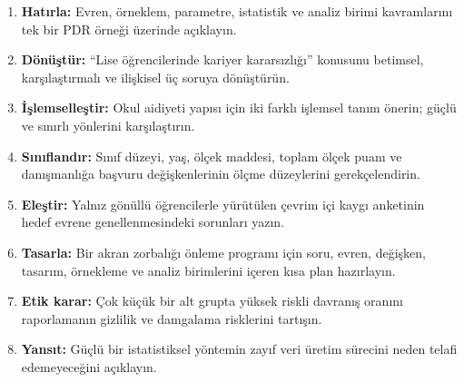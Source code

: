 \begin{enumerate}
\renewcommand{\labelenumi}{\textbf{\Alph{enumi}.}}
  \item \textbf{Hatırla:} Evren, örneklem, parametre, istatistik ve analiz birimi kavramlarını tek bir PDR örneği üzerinde açıklayın.
  \item \textbf{Dönüştür:} ``Lise öğrencilerinde kariyer kararsızlığı'' konusunu betimsel, karşılaştırmalı ve ilişkisel üç soruya dönüştürün.
  \item \textbf{İşlemselleştir:} Okul aidiyeti yapısı için iki farklı işlemsel tanım önerin; güçlü ve sınırlı yönlerini karşılaştırın.
  \item \textbf{Sınıflandır:} Sınıf düzeyi, yaş, ölçek maddesi, toplam ölçek puanı ve danışmanlığa başvuru değişkenlerinin ölçme düzeylerini gerekçelendirin.
  \item \textbf{Eleştir:} Yalnız gönüllü öğrencilerle yürütülen çevrim içi kaygı anketinin hedef evrene genellenmesindeki sorunları yazın.
  \item \textbf{Tasarla:} Bir akran zorbalığı önleme programı için soru, evren, değişken, tasarım, örnekleme ve analiz birimlerini içeren kısa plan hazırlayın.
  \item \textbf{Etik karar:} Çok küçük bir alt grupta yüksek riskli davranış oranını raporlamanın gizlilik ve damgalama risklerini tartışın.
  \item \textbf{Yansıt:} Güçlü bir istatistiksel yöntemin zayıf veri üretim sürecini neden telafi edemeyeceğini açıklayın.
\end{enumerate}

